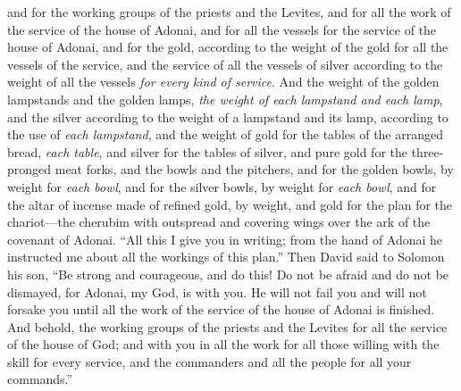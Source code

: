 \begin{biblechapter}
\verse and for the working groups of the priests and the Levites, and for all the work of the service of the house of Adonai, and for all the vessels for the service of the house of Adonai,
\verse and for the gold, according to the weight of the gold for all the vessels of the service, and the service of all the vessels of silver according to the weight of all the vessels \textit{for every kind of service}.
\verse And the weight of the golden lampstands and the golden lamps, \textit{the weight of each lampstand and each lamp}, and the silver according to the weight of a lampstand and its lamp, according to the use of \textit{each lampstand},
\verse and the weight of gold for the tables of the arranged bread, \textit{each table}, and silver for the tables of silver,
\verse and pure gold for the three-pronged meat forks, and the bowls and the pitchers, and for the golden bowls, by weight for \textit{each bowl}, and for the silver bowls, by weight for \textit{each bowl},
\verse and for the altar of incense made of refined gold, by weight, and gold for the plan for the chariot—the cherubim with outspread and covering wings over the ark of the covenant of Adonai.
\verse “All this I give you in writing; from the hand of Adonai he instructed me about all the workings of this plan.”
\verse Then David said to Solomon his son, “Be strong and courageous, and do this! Do not be afraid and do not be dismayed, for Adonai, my God, is with you. He will not fail you and will not forsake you until all the work of the service of the house of Adonai is finished.
\verse And behold, the working groups of the priests and the Levites for all the service of the house of God; and with you in all the work for all those willing with the skill for every service, and the commanders and all the people for all your commands.”
\end{biblechapter}

